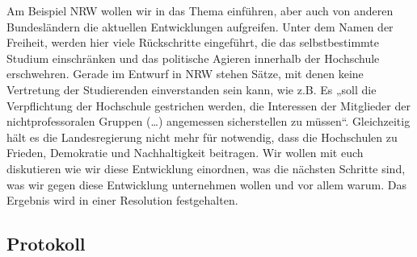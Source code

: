     Am Beispiel NRW wollen wir in das Thema einführen, aber auch von anderen Bundesländern die aktuellen Entwicklungen aufgreifen. Unter dem Namen der Freiheit, werden hier viele Rückschritte eingeführt, die das selbstbestimmte Studium einschränken und das politische Agieren innerhalb der Hochschule erschwehren. Gerade im Entwurf in NRW stehen Sätze, mit denen keine Vertretung der Studierenden einverstanden sein kann, wie z.B. Es „soll die Verpflichtung der Hochschule gestrichen werden, die Interessen der Mitglieder der nichtprofessoralen Gruppen (…) angemessen sicherstellen zu müssen“. Gleichzeitig hält es die Landesregierung nicht mehr für notwendig, dass die Hochschulen zu Frieden, Demokratie und Nachhaltigkeit beitragen. Wir wollen mit euch diskutieren wie wir diese Entwicklung einordnen, was die nächsten Schritte sind, was wir gegen diese Entwicklung unternehmen wollen und vor allem warum. Das Ergebnis wird in einer Resolution festgehalten.

  \subsection*{Protokoll}

